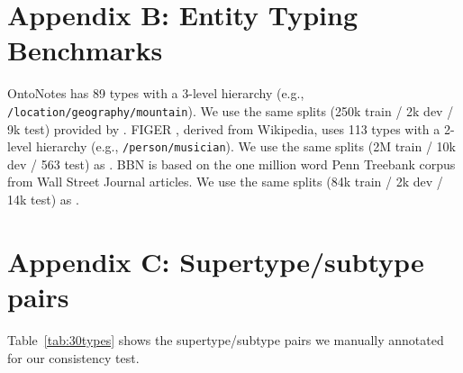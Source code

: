 \documentclass[11pt,a4paper]{article}
\begin{document}
\section*{Appendix B: Entity Typing Benchmarks}\label{app:typing_data}
OntoNotes \citep{Dan_Gillick_14} has 89 types with a 3-level hierarchy (e.g., {\tt /location/geography/mountain}). We use the same splits (250k train / 2k dev / 9k test) provided by \citep{sonse_shimaoka_17}. FIGER \citep{Xiao_Ling_12}, derived from Wikipedia, uses 113 types with a 2-level hierarchy (e.g., {\tt /person/musician}). We use the same splits (2M train / 10k dev / 563 test) as \citep{sonse_shimaoka_17}. BBN \citep{bbn} is based on the one million word Penn Treebank corpus from Wall Street Journal articles. We use the same splits (84k train / 2k dev / 14k test) as \citet{Xiang_Ren_16b, Tongfei_Chen_20}.

\section*{Appendix C: Supertype/subtype pairs}\label{app:30types}

Table~\ref{tab:30types} shows the supertype/subtype pairs we manually annotated for our consistency test.
\end{document}
